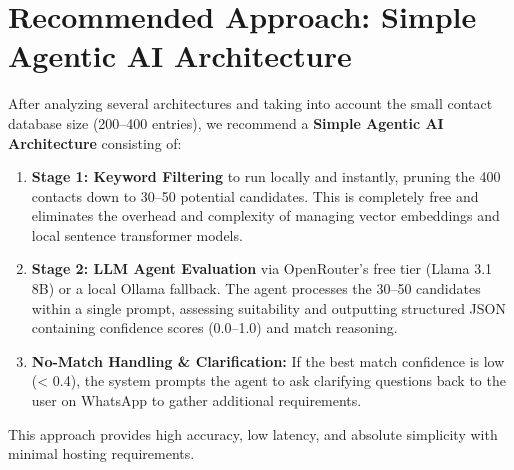 \documentclass[12pt, a4paper]{report}
\newcommand{\cost}[1]{\textbf{\color{secondarygreen}$#1}}
\begin{document}

\section{Recommended Approach: Simple Agentic AI Architecture}

After analyzing several architectures and taking into account the small contact database size (200--400 entries), we recommend a \textbf{Simple Agentic AI Architecture} consisting of:

\begin{enumerate}
    \item \textbf{Stage 1: Keyword Filtering} to run locally and instantly, pruning the 400 contacts down to 30--50 potential candidates. This is completely free and eliminates the overhead and complexity of managing vector embeddings and local sentence transformer models.
    \item \textbf{Stage 2: LLM Agent Evaluation} via OpenRouter's free tier (Llama 3.1 8B) or a local Ollama fallback. The agent processes the 30--50 candidates within a single prompt, assessing suitability and outputting structured JSON containing confidence scores (0.0--1.0) and match reasoning.
    \item \textbf{No-Match Handling \& Clarification:} If the best match confidence is low (< 0.4), the system prompts the agent to ask clarifying questions back to the user on WhatsApp to gather additional requirements.
\end{enumerate}

This approach provides high accuracy, low latency, and absolute simplicity with minimal hosting requirements.
\end{document}
